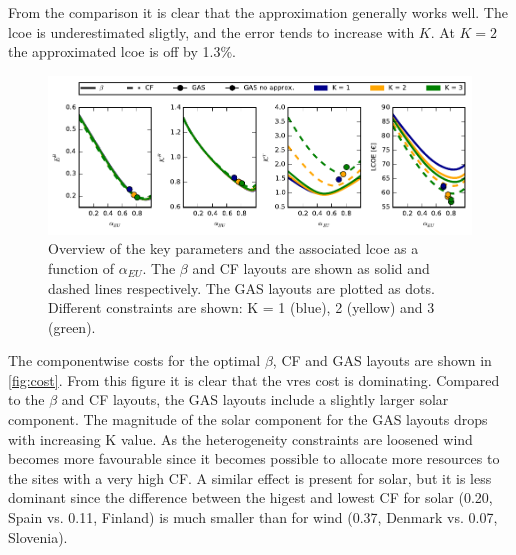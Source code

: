 \documentclass[a4paper, 5p, sort&compress]{elsarticle}%
\begin{document}
From the comparison it is clear that the approximation generally works well. The \gls{lcoe} is
underestimated sligtly, and the error tends to increase with $K$.
At $K=2$ the approximated \gls{lcoe} is off by 1.3\%.



\begin{figure}[t!]
  \centering
  \includegraphics[width = 2\columnwidth]{dataSync-new}
  \caption{Overview of the key parameters and the associated \gls{lcoe} as a
    function of $\alpha_{EU}$. The $\beta$ %
    and CF %
    layouts are shown as solid and dashed lines respectively. The GAS
    layouts are plotted as dots. Different constraints are shown: K =
    1 (blue), 2 (yellow) and 3 (green).}
  \label{fig:overview}
\end{figure}

The componentwise costs for the optimal $\beta$,
CF and GAS layouts are shown in \cref{fig:cost}. From this figure it is clear that the
\gls{vres} cost is dominating. Compared to the $\beta$
and CF layouts, the GAS layouts include a slightly larger solar component. The magnitude of the
solar component for the GAS layouts drops with increasing K value. As the heterogeneity
constraints are loosened wind becomes more favourable since it becomes possible to allocate
more resources to the sites with a very high CF. A similar effect is present for solar, but it
is less dominant since the difference between the higest and lowest CF for solar (0.20, Spain
vs. 0.11, Finland) is much smaller than for wind (0.37, Denmark vs. 0.07, Slovenia).
\end{document}
